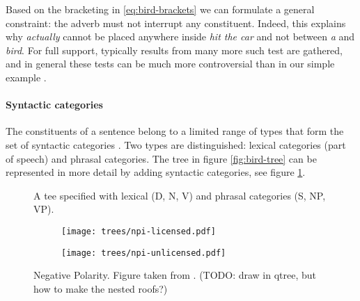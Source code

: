 Based on the bracketing in \ref{eq:bird-brackets} we can formulate a general constraint: the adverb must not interrupt any constituent. Indeed, this explains why \textit{actually} cannot be placed anywhere inside \textit{hit the car} and not between \textit{a} and \textit{bird}. For full support, typically results from many more such test are gathered, and in general these tests can be much more controversial than in our simple example \citep{carnie2010constituent}.

\paragraph{Syntactic categories} The constituents of a sentence belong to a limited range of types that form the set of syntactic categories \citep{huddleston2002grammar}. Two types are distinguished: lexical categories (part of speech) and phrasal categories. The tree in figure \ref{fig:bird-tree} can be represented in more detail by adding syntactic categories, see figure \ref{fig:bird-tree-labeled}.
\begin{figure}[h]{\textwidth}
  \center
  \caption{A tee specified with lexical (D, N, V) and phrasal categories (S, NP, VP).}
  \label{fig:bird-tree-labeled}
\end{figure}

\begin{figure}[b]
  \begin{subfigure}[b]{0.5\textwidth}
		\texttt{[image: trees/npi-licensed.pdf]}
    \label{fig:tree-npi-licensed}
	\end{subfigure}
	\begin{subfigure}[b]{0.5\textwidth}
		\texttt{[image: trees/npi-unlicensed.pdf]}
    \label{fig:tree-npi-unlicensed}
	\end{subfigure}
\caption{Negative Polarity. Figure taken from \cite{Everaert+2015:structures}. (TODO: draw in qtree, but how to make the nested roofs?)}
\label{fig:trees-npi}
\end{figure}

